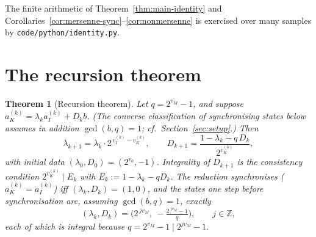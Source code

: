 \documentclass[11pt,reqno]{amsart}
\theoremstyle{plain}
\newtheorem{theorem}{Theorem}[section]
\theoremstyle{definition}
\theoremstyle{remark}
\newcommand{\Z}{\mathbb{Z}}
\newcommand{\vk}{v_{K}}
\newcommand{\vi}{v_{I}}
\newcommand{\aK}{a_{K}}
\newcommand{\aI}{a_{I}}
\newcommand{\vM}{v_{M}}
\newcommand{\srcpath}[1]{\nolinkurl{#1}}
\begin{document}
The finite arithmetic of Theorem~\ref{thm:main-identity} and
Corollaries~\ref{cor:mersenne-sync}--\ref{cor:nonmersenne} is exercised over
many samples by \srcpath{code/python/identity.py}.

\section{The recursion theorem}\label{sec:recursion}

\begin{theorem}[Recursion theorem]\label{thm:recursion}
Let $q = 2^{\vM} - 1$, and suppose $\aK^{(k)} = \lambda_k \aI^{(k)} + D_k b$.
(The converse classification of synchronising states below assumes in
addition $\gcd(b, q) = 1$; cf.\ Section~\ref{sec:setup}.) Then
\[
\lambda_{k+1} = \lambda_k \cdot 2^{\,\vi^{(k)} - \vk^{(k)}}, \qquad
D_{k+1} = \frac{1 - \lambda_k - q\,D_k}{2^{\vk^{(k)}}} ,
\]
with initial data $(\lambda_0, D_0) = (2^{v_0}, -1)$. Integrality of
$D_{k+1}$ is the consistency condition
$2^{\vk^{(k)}} \mid E_k$ with $E_k := 1 - \lambda_k - q D_k$. The reduction
synchronises ($\aK^{(k)} = \aI^{(k)}$) iff $(\lambda_k, D_k) = (1, 0)$, and
the states one step before synchronisation are, assuming $\gcd(b, q) = 1$,
exactly
\[
(\lambda_k, D_k) = \Big(2^{\,j\vM},\ -\tfrac{2^{\,j\vM} - 1}{q}\Big),
\qquad j \in \Z,
\]
each of which is integral because $q = 2^{\vM} - 1 \mid 2^{j\vM} - 1$.
\end{theorem}
\end{document}

